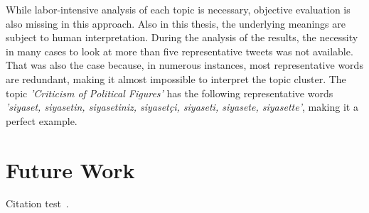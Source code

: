 While labor-intensive analysis of each topic is necessary, objective evaluation is also missing in this 
approach. Also in this thesis, the underlying meanings are subject to human interpretation. During the 
analysis of the results, the necessity in many cases to look at more than five representative tweets was 
not available. That was also the case because, in numerous instances, most representative words are 
redundant, making it almost impossible to interpret the topic cluster. The topic 
\textit{'Criticism of Political Figures'} has the following representative words 
\textit{'siyaset, siyasetin, siyasetiniz, siyasetçi, siyaseti, siyasete, siyasette'}, making it a perfect 
example.

\section{Future Work}\label{section:future_work}
Citation test~\parencite{latex}.
